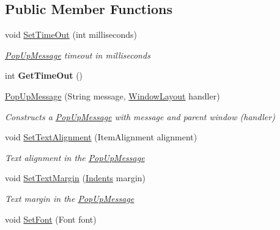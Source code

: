 \subsection*{Public Member Functions}
\begin{DoxyCompactItemize}
\item 
void \mbox{\hyperlink{class_space_v_i_l_1_1_pop_up_message_aed1edbb9ca961585032b46bebd61fbea}{Set\+Time\+Out}} (int milliseconds)
\begin{DoxyCompactList}\small\item\em \mbox{\hyperlink{class_space_v_i_l_1_1_pop_up_message}{Pop\+Up\+Message}} timeout in milliseconds \end{DoxyCompactList}\item 
\mbox{\label{class_space_v_i_l_1_1_pop_up_message_aca66f9ab026cee580727ebdbce2efd83}} 
int {\bfseries Get\+Time\+Out} ()
\item 
\mbox{\hyperlink{class_space_v_i_l_1_1_pop_up_message_ab0331b1354c101d640ed34ec060b3bcf}{Pop\+Up\+Message}} (String message, \mbox{\hyperlink{class_space_v_i_l_1_1_window_layout}{Window\+Layout}} handler)
\begin{DoxyCompactList}\small\item\em Constructs a \mbox{\hyperlink{class_space_v_i_l_1_1_pop_up_message}{Pop\+Up\+Message}} with message and parent window (handler) \end{DoxyCompactList}\item 
void \mbox{\hyperlink{class_space_v_i_l_1_1_pop_up_message_af4bf4824354cfdbe240c1fc613bc796e}{Set\+Text\+Alignment}} (Item\+Alignment alignment)
\begin{DoxyCompactList}\small\item\em Text alignment in the \mbox{\hyperlink{class_space_v_i_l_1_1_pop_up_message}{Pop\+Up\+Message}} \end{DoxyCompactList}\item 
void \mbox{\hyperlink{class_space_v_i_l_1_1_pop_up_message_a4e8ddaa2f3270f1b5799c672525b8a1d}{Set\+Text\+Margin}} (\mbox{\hyperlink{struct_space_v_i_l_1_1_decorations_1_1_indents}{Indents}} margin)
\begin{DoxyCompactList}\small\item\em Text margin in the \mbox{\hyperlink{class_space_v_i_l_1_1_pop_up_message}{Pop\+Up\+Message}} \end{DoxyCompactList}\item 
void \mbox{\hyperlink{class_space_v_i_l_1_1_pop_up_message_a06b40259435cf6916dc11467eec83d01}{Set\+Font}} (Font font)

\end{DoxyCompactItemize}
